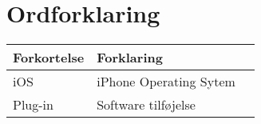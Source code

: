 \chapter*{Ordforklaring}

\begin{tabularx}{\textwidth}{l l X} \hline
	\textbf{Forkortelse}  & \textbf{Forklaring} \\ \hline
	iOS&  iPhone Operating Sytem& \\
	Plug-in&  Software tilføjelse& \\
	
\end{tabularx}
